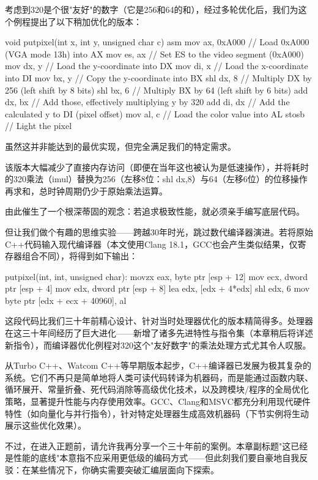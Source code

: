 考虑到320是个很"友好"的数字（它是256和64的和），经过多轮优化后，我们为这个例程提出了以下稍加优化的版本：

\begin{cpp}
void putpixel(int x, int y, unsigned char c) {
asm {
    mov ax, 0xA000 // Load 0xA000 (VGA mode 13h) into AX
    mov es, ax // Set ES to the video segment (0xA000)
    mov dx, y // Load the y-coordinate into DX
    mov di, x // Load the x-coordinate into DI
    mov bx, y // Copy the y-coordinate into BX
    shl dx, 8 // Multiply DX by 256 (left shift by 8 bits)
    shl bx, 6 // Multiply BX by 64 (left shift by 6 bits)
    add dx, bx // Add those, effectively multiplying y by 320
    add di, dx // Add the calculated y to DI (pixel offset)
    mov al, c // Load the color value into AL
    stosb // Light the pixel
  } 
}
\end{cpp}

虽然这并非能达到的最优实现，但完全满足我们的特定需求。

该版本大幅减少了直接内存访问（即便在当年这也被认为是低速操作），并将耗时的320乘法（imul）替换为256（左移8位：shl dx,8）与64（左移6位）的位移操作再求和，总时钟周期仍少于原始乘法运算。

由此催生了一个根深蒂固的观念：若追求极致性能，就必须亲手编写底层代码。

但让我们做个有趣的思维实验——跨越30年时光，跳过数代编译器演进。若将原始C++代码输入现代编译器（本文使用Clang 18.1，GCC也会产生类似结果，仅寄存器组合不同），将得到如下输出：

\begin{shell}
putpixel(int, int, unsigned char):
  movzx eax, byte ptr [esp + 12]
  mov ecx, dword ptr [esp + 4]
  mov edx, dword ptr [esp + 8]
  lea edx, [edx + 4*edx]
  shl edx, 6
  mov byte ptr [edx + ecx + 40960], al
\end{shell}

这段代码比我们三十年前精心设计、针对当时处理器优化的版本精简得多。处理器在这三十年间经历了巨大进化——新增了诸多先进特性与指令集（本章稍后将详述新指令），而编译器优化例程对320这个"友好数字"的乘法处理方式尤其令人叹服。

从Turbo C++、Watcom C++等早期版本起步，C++编译器已发展为极其复杂的系统。它们不再只是简单地将人类可读代码转译为机器码，而是能通过函数内联、循环展开、常量折叠、死代码消除等高级优化技术，以及跨模块/程序的全局优化策略，显著提升性能与内存使用效率。GCC、Clang和MSVC都充分利用现代硬件特性（如向量化与并行指令），针对特定处理器生成高效机器码（下节实例将生动展示这些优化效果）。

不过，在进入正题前，请允许我再分享一个三十年前的案例。本章副标题"这已经是性能的底线"本意指不应采用更低级的编码方式——但此刻我们要自豪地自我反驳：在某些情况下，你确实需要突破汇编层面向下探索。

